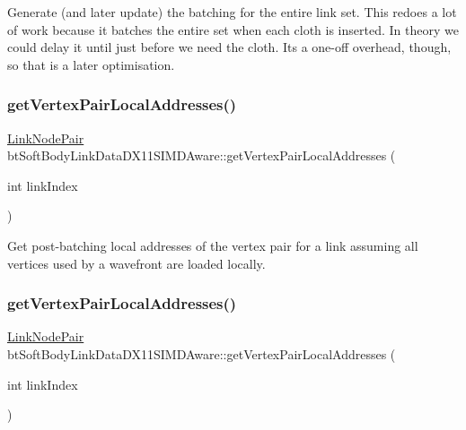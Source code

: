 Generate (and later update) the batching for the entire link set. This redoes a lot of work because it batches the entire set when each cloth is inserted. In theory we could delay it until just before we need the cloth. It\textquotesingle{}s a one-\/off overhead, though, so that is a later optimisation. \mbox{\label{classbtSoftBodyLinkDataDX11SIMDAware_ac3eb087312fd7433a9f32f8eee8e40a3}} 
\subsubsection{\texorpdfstring{get\+Vertex\+Pair\+Local\+Addresses()}{getVertexPairLocalAddresses()}\hspace{0.1cm}{\footnotesize\ttfamily [1/2]}}
{\footnotesize\ttfamily \hyperlink{classbtSoftBodyLinkData_1_1LinkNodePair}{Link\+Node\+Pair} bt\+Soft\+Body\+Link\+Data\+D\+X11\+S\+I\+M\+D\+Aware\+::get\+Vertex\+Pair\+Local\+Addresses (\begin{DoxyParamCaption}\item[{int}]{link\+Index }\end{DoxyParamCaption})\hspace{0.3cm}{\ttfamily [inline]}}

Get post-\/batching local addresses of the vertex pair for a link assuming all vertices used by a wavefront are loaded locally. \mbox{\label{classbtSoftBodyLinkDataDX11SIMDAware_ac3eb087312fd7433a9f32f8eee8e40a3}} 
\subsubsection{\texorpdfstring{get\+Vertex\+Pair\+Local\+Addresses()}{getVertexPairLocalAddresses()}\hspace{0.1cm}{\footnotesize\ttfamily [2/2]}}
{\footnotesize\ttfamily \hyperlink{classbtSoftBodyLinkData_1_1LinkNodePair}{Link\+Node\+Pair} bt\+Soft\+Body\+Link\+Data\+D\+X11\+S\+I\+M\+D\+Aware\+::get\+Vertex\+Pair\+Local\+Addresses (\begin{DoxyParamCaption}\item[{int}]{link\+Index }\end{DoxyParamCaption})\hspace{0.3cm}{\ttfamily [inline]}}

